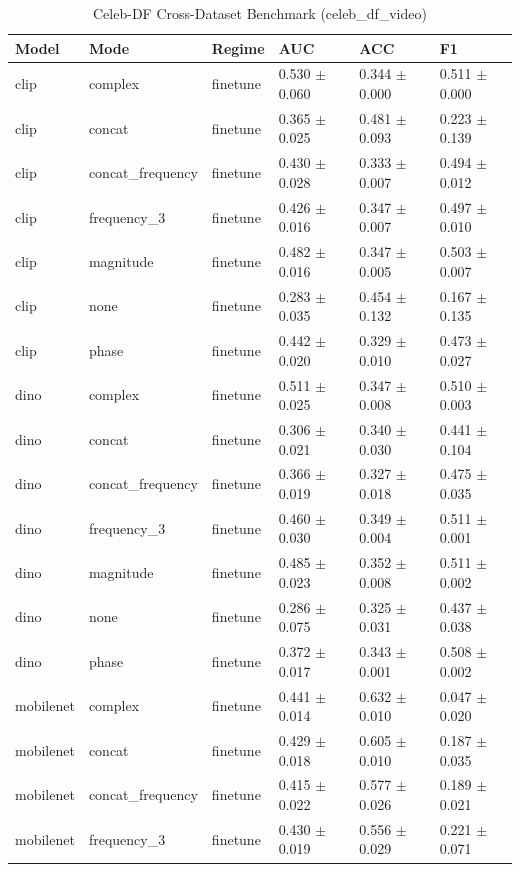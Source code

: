 \begin{table}
\caption{Celeb-DF Cross-Dataset Benchmark (celeb_df_video)}
\label{tab:celebdf_celeb_df_video}
\begin{tabular}{llllll}
\toprule
Model & Mode & Regime & AUC & ACC & F1 \\
\midrule
clip & complex & finetune & 0.530 $\pm$ 0.060 & 0.344 $\pm$ 0.000 & 0.511 $\pm$ 0.000 \\
clip & concat & finetune & 0.365 $\pm$ 0.025 & 0.481 $\pm$ 0.093 & 0.223 $\pm$ 0.139 \\
clip & concat_frequency & finetune & 0.430 $\pm$ 0.028 & 0.333 $\pm$ 0.007 & 0.494 $\pm$ 0.012 \\
clip & frequency_3 & finetune & 0.426 $\pm$ 0.016 & 0.347 $\pm$ 0.007 & 0.497 $\pm$ 0.010 \\
clip & magnitude & finetune & 0.482 $\pm$ 0.016 & 0.347 $\pm$ 0.005 & 0.503 $\pm$ 0.007 \\
clip & none & finetune & 0.283 $\pm$ 0.035 & 0.454 $\pm$ 0.132 & 0.167 $\pm$ 0.135 \\
clip & phase & finetune & 0.442 $\pm$ 0.020 & 0.329 $\pm$ 0.010 & 0.473 $\pm$ 0.027 \\
dino & complex & finetune & 0.511 $\pm$ 0.025 & 0.347 $\pm$ 0.008 & 0.510 $\pm$ 0.003 \\
dino & concat & finetune & 0.306 $\pm$ 0.021 & 0.340 $\pm$ 0.030 & 0.441 $\pm$ 0.104 \\
dino & concat_frequency & finetune & 0.366 $\pm$ 0.019 & 0.327 $\pm$ 0.018 & 0.475 $\pm$ 0.035 \\
dino & frequency_3 & finetune & 0.460 $\pm$ 0.030 & 0.349 $\pm$ 0.004 & 0.511 $\pm$ 0.001 \\
dino & magnitude & finetune & 0.485 $\pm$ 0.023 & 0.352 $\pm$ 0.008 & 0.511 $\pm$ 0.002 \\
dino & none & finetune & 0.286 $\pm$ 0.075 & 0.325 $\pm$ 0.031 & 0.437 $\pm$ 0.038 \\
dino & phase & finetune & 0.372 $\pm$ 0.017 & 0.343 $\pm$ 0.001 & 0.508 $\pm$ 0.002 \\
mobilenet & complex & finetune & 0.441 $\pm$ 0.014 & 0.632 $\pm$ 0.010 & 0.047 $\pm$ 0.020 \\
mobilenet & concat & finetune & 0.429 $\pm$ 0.018 & 0.605 $\pm$ 0.010 & 0.187 $\pm$ 0.035 \\
mobilenet & concat_frequency & finetune & 0.415 $\pm$ 0.022 & 0.577 $\pm$ 0.026 & 0.189 $\pm$ 0.021 \\
mobilenet & frequency_3 & finetune & 0.430 $\pm$ 0.019 & 0.556 $\pm$ 0.029 & 0.221 $\pm$ 0.071 \\

\end{tabular}
\end{table}
